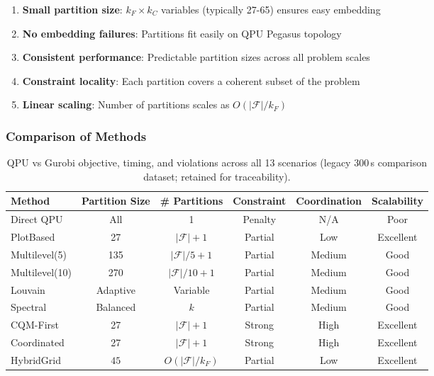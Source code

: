 \documentclass{oqireport}
\begin{document}
\begin{enumerate}
\item \textbf{Small partition size}: $k_F \times k_C$ variables (typically 27-65) ensures easy embedding
\item \textbf{No embedding failures}: Partitions fit easily on QPU Pegasus topology
\item \textbf{Consistent performance}: Predictable partition sizes across all problem scales
\item \textbf{Constraint locality}: Each partition covers a coherent subset of the problem
\item \textbf{Linear scaling}: Number of partitions scales as $O(|\mathcal{F}| / k_F)$
\end{enumerate}

\subsubsection{Comparison of Methods}

\begin{table}[H]
\centering
\caption{QPU vs Gurobi objective, timing, and violations across all 13 scenarios (legacy 300\,s comparison dataset; retained for traceability).}
\label{tab:method_comparison}
\scriptsize
\begin{tabular}{lccccc}
\toprule
\textbf{Method} & \textbf{Partition Size} & \textbf{\# Partitions} & \textbf{Constraint} & \textbf{Coordination} & \textbf{Scalability} \\
\midrule
Direct QPU & All & 1 & Penalty & N/A & Poor \\
PlotBased & 27 & $|\mathcal{F}|+1$ & Partial & Low & Excellent \\
Multilevel(5) & 135 & $|\mathcal{F}|/5+1$ & Partial & Medium & Good \\
Multilevel(10) & 270 & $|\mathcal{F}|/10+1$ & Partial & Medium & Good \\
Louvain & Adaptive & Variable & Partial & Medium & Good \\
Spectral & Balanced & $k$ & Partial & Medium & Good \\
CQM-First & 27 & $|\mathcal{F}|+1$ & Strong & High & Excellent \\
Coordinated & 27 & $|\mathcal{F}|+1$ & Strong & High & Excellent \\
HybridGrid & $45$ & $O(|\mathcal{F}|/k_F)$ & Partial & Low & Excellent \\
\bottomrule
\end{tabular}
\end{table}
\end{document}
